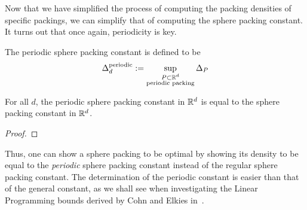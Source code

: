 Now that we have simplified the process of computing the packing densities of specific packings, we can simplify that of computing the sphere packing constant. It turns out that once again, periodicity is key.

\begin{definition}\label{def:Periodic-sphere-packing-constant}\notready
    The periodic sphere packing constant is defined to be
    $$ \Delta_{d}^{\text{periodic}} := \sup_{\substack{P \subset \mathbb{R}^d \\ \text{periodic packing}}} \Delta_P$$
\end{definition}

\begin{theorem}\label{thm:periodic-packing-optimal}\notready
    For all $d$, the periodic sphere packing constant in $\mathbb{R}^d$ is equal to the sphere packing constant in $\mathbb{R}^d$.
\end{theorem}
\begin{proof}
\end{proof}

Thus, one can show a sphere packing to be optimal by showing its density to be equal to the \emph{periodic} sphere packing constant instead of the regular sphere packing constant. The determination of the periodic constant is easier than that of the general constant, as we shall see when investigating the Linear Programming bounds derived by Cohn and Elkies in~\cite{ElkiesCohn}.